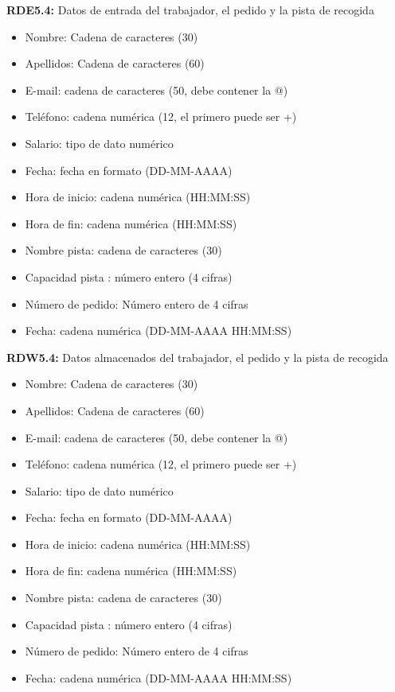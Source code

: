 \textbf{RDE5.4:} Datos de entrada del trabajador, el pedido y la pista de recogida
\begin{itemize}
    \item Nombre: Cadena de caracteres (30)
    \item Apellidos: Cadena de caracteres (60)
    \item E-mail: cadena de caracteres (50, debe contener la @)
    \item Teléfono: cadena numérica (12, el primero puede ser +)
    \item Salario: tipo de dato numérico
\newline    
    \item Fecha: fecha en formato (DD-MM-AAAA)    
    \item Hora de inicio: cadena numérica (HH:MM:SS)
    \item Hora de fin: cadena numérica (HH:MM:SS)
\newline
	\item Nombre pista: cadena de caracteres (30)
	\item Capacidad pista : número entero (4 cifras)
\newline
    \item Número de pedido: Número entero de 4 cifras
	\item Fecha: cadena numérica (DD-MM-AAAA HH:MM:SS)
\end{itemize}

\textbf{RDW5.4:} Datos almacenados del trabajador, el pedido y la pista de recogida
\begin{itemize}
    \item Nombre: Cadena de caracteres (30)
    \item Apellidos: Cadena de caracteres (60)
    \item E-mail: cadena de caracteres (50, debe contener la @)
    \item Teléfono: cadena numérica (12, el primero puede ser +)
    \item Salario: tipo de dato numérico
\newline    
    \item Fecha: fecha en formato (DD-MM-AAAA)    
    \item Hora de inicio: cadena numérica (HH:MM:SS)
    \item Hora de fin: cadena numérica (HH:MM:SS)
\newline
	\item Nombre pista: cadena de caracteres (30)
	\item Capacidad pista : número entero (4 cifras)
\newline
    \item Número de pedido: Número entero de 4 cifras
	\item Fecha: cadena numérica (DD-MM-AAAA HH:MM:SS)
\end{itemize}

